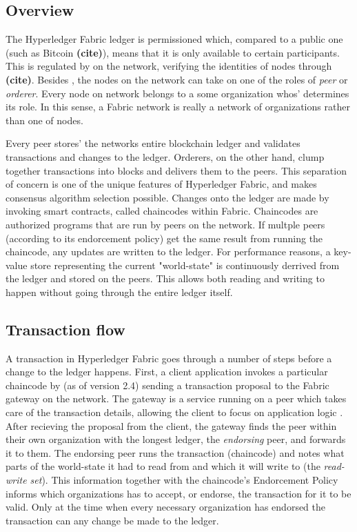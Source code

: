 \documentclass[english, biblatex, digitaloutput]{kththesis}
\begin{document}
\subsection{Overview}

The Hyperledger Fabric ledger is permissioned which, compared to a public one (such as Bitcoin \textbf{(cite)}), means that it is only available to certain participants. This is regulated by  on the network, verifying the identities of nodes through  \textbf{(cite)}. Besides , the nodes on the network can take on one of the roles of \textit{peer} or \textit{orderer}. Every node on network belongs to a some organization whos'  determines its role. In this sense, a Fabric network is really a network of organizations rather than one of nodes.

Every peer stores' the networks entire blockchain ledger and validates transactions and changes to the ledger. Orderers, on the other hand, clump together transactions into blocks and delivers them to the peers. This separation of concern is one of the unique features of Hyperledger Fabric, and makes consensus algorithm selection possible. Changes onto the ledger are made by invoking smart contracts, called chaincodes within Fabric. Chaincodes are authorized programs that are run by peers on the network. If multple peers (according to its endorcement policy) get the same result from running the chaincode, any updates are written to the ledger. For performance reasons, a key-value store representing the current "world-state" is continuously derrived from the ledger and stored on the peers. This allows both reading and writing to happen without going through the entire ledger itself.


\subsection{Transaction flow}
\label{subsec:transaction-flow}

A transaction in Hyperledger Fabric goes through a number of steps before a change to the ledger happens. First, a client application invokes a particular chaincode by (as of version 2.4) sending a transaction proposal to the Fabric gateway on the network. The gateway is a service running on a peer which takes care of the transaction details, allowing the client to focus on application logic \cite{fabric_gateway_2022}. After recieving the proposal from the client, the gateway finds the peer within their own organization with the longest ledger, the \textit{endorsing} peer, and forwards it to them. The endorsing peer runs the transaction (\ie chaincode) and notes what parts of the world-state it had to read from and which it will write to (the \textit{read-write set}). This information together with the chaincode's Endorcement Policy informs which organizations has to accept, or endorse, the transaction for it to be valid. Only at the time when every necessary organization has endorsed the transaction can any change be made to the ledger.
\end{document}
